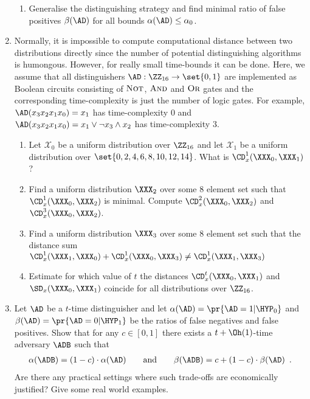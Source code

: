 \documentclass{article}
\begin{document}
\begin{enumerate}
\begin{enumerate}
  \item Generalise the distinguishing strategy and find minimal ratio
    of false positives $\beta(\AD)$ for all bounds
    $\alpha(\AD)\leq \alpha_0$.
   \end{enumerate}
 \item Normally, it is impossible to compute computational distance
   between two distributions directly since the number of potential
   distinguishing algorithms is humongous. However, for really small
   time-bounds it can be done. Here, we assume that all distinguishers
   $\AD:\ZZ_{16}\to\set{0,1}$ are implemented as Boolean circuits
   consisting of $\textsc{Not}$, $\textsc{And}$ and $\textsc{Or}$
   gates and the corresponding time-complexity is just the number of
   logic gates. For example, $\AD(x_3x_2x_1x_0)= x_1$ has
   time-complexity $0$ and $\AD(x_3x_2x_1x_0)= x_1\vee \neg x_3\wedge
   x_2$ has  time-complexity $3$.
   \begin{enumerate}
   \item Let $\mathcal{X}_0$ be a uniform distribution over $\ZZ_{16}$
     and let $\mathcal{X}_1$ be a uniform distribution over
     $\set{0,2,4,6,8,10,12,14}$. What is $\CD_x^1(\XXX_0,\XXX_1)$?
   \item Find a uniform distribution $\XXX_2$ over some $8$ element
     set such that $\CD_x^1(\XXX_0,\XXX_2)$ is minimal. Compute
     $\CD_x^2(\XXX_0,\XXX_2)$ and $\CD_x^3(\XXX_0,\XXX_2)$.
   \item Find a uniform distribution $\XXX_3$ over some $8$ element
     set such that the distance sum $\CD_x^1(\XXX_1,\XXX_0)+
     \CD_x^1(\XXX_0,\XXX_3)\neq\CD_x^1(\XXX_1,\XXX_3)$
   \item Estimate for which value of $t$ the distances
     $\CD_x^t(\XXX_0,\XXX_1)$ and $\SD_x(\XXX_0,\XXX_1)$ coincide for
     all distributions over $\ZZ_{16}$.
   \end{enumerate}
   \item Let $\AD$ be a $t$-time distinguisher and let
   $\alpha(\AD)=\pr{\AD=1|\HYP_0}$ and $\beta(\AD)=\pr{\AD=0|\HYP_1}$
   be the ratios of false negatives and false positives. Show that for
   any $c\in[0,1]$ there exists a $t+\Oh(1)$-time adversary $\ADB$ such that
  \begin{align*}
    \alpha(\ADB)=(1-c)\cdot\alpha(\AD)\qquad\text{and}\qquad
    \beta(\ADB)=c+(1-c)\cdot\beta(\AD)\enspace.
  \end{align*}
  Are there any practical settings where such trade-offs are
  economically justified? Give some real world examples.


\end{enumerate}
\end{document}
